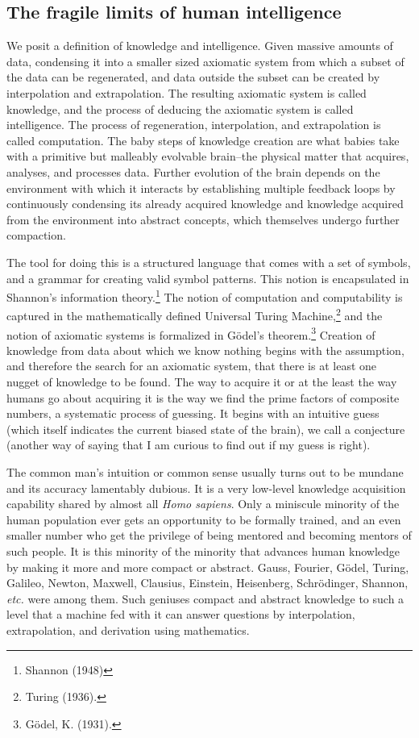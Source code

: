 \begin{multicols}{2}
\subsection*{The fragile limits of human intelligence}

We posit a definition of knowledge and intelligence. Given massive amounts of data, condensing it into a smaller sized axiomatic system from which a subset of the data can be regenerated, and data outside the subset can be created by interpolation and extrapolation. The resulting axiomatic system is called knowledge, and the process of deducing the axiomatic system is called intelligence. The process of regeneration, interpolation, and extrapolation is called computation. The baby steps of knowledge creation are what babies take with a primitive but malleably evolvable brain--the physical matter that acquires, analyses, and processes data. Further evolution of the brain depends on the environment with which it interacts by establishing multiple feedback loops by continuously condensing its already acquired knowledge and knowledge acquired from the environment into abstract concepts, which themselves undergo further compaction.

The tool for doing this is a structured language that comes with a set of symbols, and a grammar for creating valid symbol patterns. This notion is encapsulated in Shannon's information theory.\footnote{Shannon (1948)}  The notion of computation and computability is captured in the mathematically defined Universal Turing Machine,\footnote{Turing (1936).}  and the notion of axiomatic systems is formalized in Gödel's theorem.\footnote{Gödel, K. (1931).}  Creation of knowledge from data about which we know nothing begins with the assumption, and therefore the search for an axiomatic system, that there is at least one nugget of knowledge to be found. The way to acquire it or at the least the way humans go about acquiring it is the way we find the prime factors of composite numbers, a systematic process of guessing. It begins with an intuitive guess (which itself indicates the current biased state of the brain), we call a conjecture (another way of saying that I am curious to find out if my guess is right).

The common man's intuition or common sense usually turns out to be mundane and its accuracy lamentably dubious. It is a very low-level knowledge acquisition capability shared by almost all \textit{Homo sapiens}. Only a miniscule minority of the human population ever gets an opportunity to be formally trained, and an even smaller number who get the privilege of being mentored and becoming mentors of such people. It is this minority of the minority that advances human knowledge by making it more and more compact or abstract. Gauss, Fourier, Gödel, Turing, Galileo, Newton, Maxwell, Clausius, Einstein, Heisenberg, Schrödinger, Shannon, \textit{etc.} were among them. Such geniuses compact and abstract knowledge to such a level that a machine fed with it can answer questions by interpolation, extrapolation, and derivation using mathematics.


\end{multicols}
